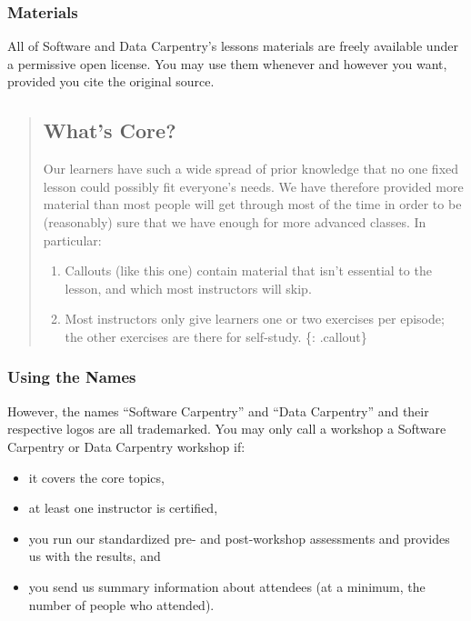 \subsubsection{Materials}\label{materials}

All of Software and Data Carpentry's lessons materials are freely
available under a permissive open license. You may use
them whenever and however you want, provided you cite the original
source.

\begin{quote}
\subsection{What's Core?}\label{whats-core}

Our learners have such a wide spread of prior knowledge that no one
fixed lesson could possibly fit everyone's needs. We have therefore
provided more material than most people will get through most of the
time in order to be (reasonably) sure that we have enough for more
advanced classes. In particular:

\begin{enumerate}
\item
  Callouts (like this one) contain material that isn't essential to the
  lesson, and which most instructors will skip.
\item
  Most instructors only give learners one or two exercises per episode;
  the other exercises are there for self-study. \{: .callout\}
\end{enumerate}
\end{quote}

\subsubsection{Using the Names}\label{using-the-names}

However, the names ``Software Carpentry'' and ``Data Carpentry'' and
their respective logos are all trademarked. You may only call a workshop
a Software Carpentry or Data Carpentry workshop if:

\begin{itemize}
\item
  it covers the core topics,
\item
  at least one instructor is certified,
\item
  you run our standardized pre- and post-workshop assessments and
  provides us with the results, and
\item
  you send us summary information about attendees (at a minimum, the
  number of people who attended).
\end{itemize}

